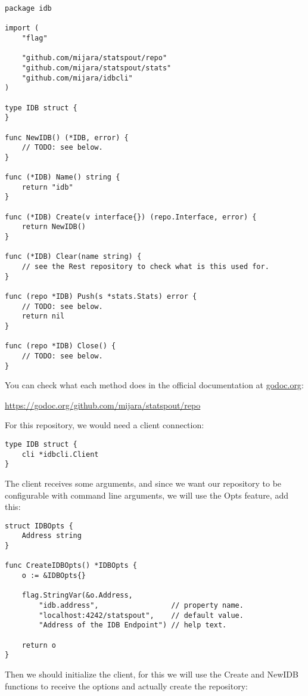 \begin{lstlisting}[language=Golang]
package idb

import (
    "flag"

    "github.com/mijara/statspout/repo"
    "github.com/mijara/statspout/stats"
    "github.com/mijara/idbcli"
)

type IDB struct {
}

func NewIDB() (*IDB, error) {
	// TODO: see below.
}

func (*IDB) Name() string {
	return "idb"
}

func (*IDB) Create(v interface{}) (repo.Interface, error) {
	return NewIDB()
}

func (*IDB) Clear(name string) {
    // see the Rest repository to check what is this used for.
}

func (repo *IDB) Push(s *stats.Stats) error {
    // TODO: see below.
	return nil
}

func (repo *IDB) Close() {
    // TODO: see below.
}
\end{lstlisting}

You can check what each method does in the official documentation at \url{godoc.org}:

\begin{center}
\url{https://godoc.org/github.com/mijara/statspout/repo}
\end{center}

For this repository, we would need a client connection:

\begin{lstlisting}[language=Golang]
type IDB struct {
    cli *idbcli.Client
}
\end{lstlisting}

The client receives some arguments, and since we want our repository to be configurable with command line arguments, we will use the Opts feature, add this:

\begin{lstlisting}[language=Golang]
struct IDBOpts {
    Address string
}

func CreateIDBOpts() *IDBOpts {
    o := &IDBOpts{}

    flag.StringVar(&o.Address,
        "idb.address",                 // property name.
        "localhost:4242/statspout",    // default value.
        "Address of the IDB Endpoint") // help text.

    return o
}
\end{lstlisting}

Then we should initialize the client, for this we will use the Create and NewIDB functions to receive the options and actually create the repository:

